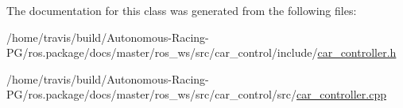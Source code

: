 The documentation for this class was generated from the following files\+:\begin{DoxyCompactItemize}
\item 
/home/travis/build/\+Autonomous-\/\+Racing-\/\+P\+G/ros.\+package/docs/master/ros\+\_\+ws/src/car\+\_\+control/include/\hyperlink{car__controller_8h}{car\+\_\+controller.\+h}\item 
/home/travis/build/\+Autonomous-\/\+Racing-\/\+P\+G/ros.\+package/docs/master/ros\+\_\+ws/src/car\+\_\+control/src/\hyperlink{car__controller_8cpp}{car\+\_\+controller.\+cpp}\end{DoxyCompactItemize}
